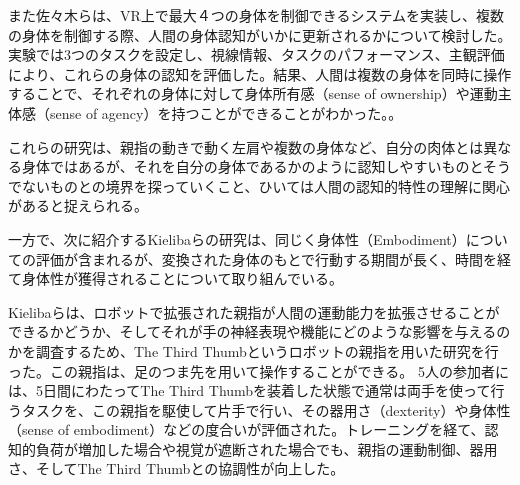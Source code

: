 また佐々木らは、VR上で最大４つの身体を制御できるシステムを実装し、複数の身体を制御する際、人間の身体認知がいかに更新されるかについて検討した。実験では3つのタスクを設定し、視線情報、タスクのパフォーマンス、主観評価により、これらの身体の認知を評価した。結果、人間は複数の身体を同時に操作することで、それぞれの身体に対して身体所有感（sense of ownership）や運動主体感（sense of agency）を持つことができることがわかった。\cite{sasaki2022multisoma}。

これらの研究は、親指の動きで動く左肩や複数の身体など、自分の肉体とは異なる身体ではあるが、それを自分の身体であるかのように認知しやすいものとそうでないものとの境界を探っていくこと、ひいては人間の認知的特性の理解に関心があると捉えられる。

一方で、次に紹介するKielibaらの研究は、同じく身体性（Embodiment）についての評価が含まれるが、変換された身体のもとで行動する期間が長く、時間を経て身体性が獲得されることについて取り組んでいる。




Kielibaら\cite{kieliba2021robotic}は、ロボットで拡張された親指が人間の運動能力を拡張させることができるかどうか、そしてそれが手の神経表現や機能にどのような影響を与えるのかを調査するため、The Third Thumbというロボットの親指を用いた研究を行った。この親指は、足のつま先を用いて操作することができる。
5人の参加者には、5日間にわたってThe Third Thumbを装着した状態で通常は両手を使って行うタスクを、この親指を駆使して片手で行い、その器用さ（dexterity）や身体性（sense of embodiment）などの度合いが評価された。トレーニングを経て、認知的負荷が増加した場合や視覚が遮断された場合でも、親指の運動制御、器用さ、そしてThe Third Thumbとの協調性が向上した。

